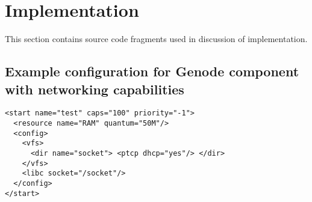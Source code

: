 \appendix
\chapter{Implementation}
This section contains source code fragments used in discussion of
implementation.  

\section{Example configuration for Genode component with networking
capabilities}
\label{appex:conf-sample}

\begin{lstlisting}
<start name="test" caps="100" priority="-1">
  <resource name="RAM" quantum="50M"/>
  <config>
    <vfs>
      <dir name="socket"> <ptcp dhcp="yes"/> </dir>
    </vfs>
    <libc socket="/socket"/>
  </config>
</start>
\end{lstlisting}
